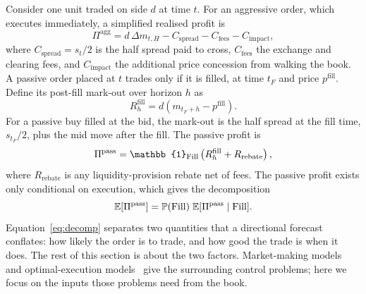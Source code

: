 Consider one unit traded on side $d$ at time $t$. For an aggressive order, which executes
immediately, a simplified realised profit is
\begin{equation}
  \Pi^{\text{agg}} = d\,\Delta m_{t,H} - C_{\text{spread}} - C_{\text{fees}} - C_{\text{impact}},
\end{equation}
where $C_{\text{spread}} = s_t/2$ is the half spread paid to cross, $C_{\text{fees}}$ the exchange
and clearing fees, and $C_{\text{impact}}$ the additional price concession from walking the book.
A passive order placed at $t$ trades only if it is filled, at time $t_F$ and price
$p^{\text{fill}}$. Define its post-fill mark-out over horizon $h$ as
\begin{equation}
  R^{\text{fill}}_{h} = d\left(m_{t_F+h} - p^{\text{fill}}\right).
  \label{eq:markout}
\end{equation}
For a passive buy filled at the bid, the mark-out is the half spread at the fill time,
$s_{t_F}/2$, plus the mid move after the fill. The passive profit is
\begin{equation}
  \Pi^{\text{pass}} = \mathbb{1}_{\Fill}\left(R^{\text{fill}}_{h} + R_{\text{rebate}}\right),
\end{equation}
where $R_{\text{rebate}}$ is any liquidity-provision rebate net of fees.
 The passive profit exists
only conditional on execution, which gives the decomposition
\begin{equation}
  \mathbb{E}[\Pi^{\text{pass}}] = \mathbb{P}(\mathrm{Fill})\; \mathbb{E}[\Pi^{\text{pass}} \mid \mathrm{Fill}].
  \label{eq:decomp}
\end{equation}
Equation~\eqref{eq:decomp} separates two quantities that a directional forecast conflates: how
likely the order is to trade, and how good the trade is when it does. The rest of this section is
about the two factors. Market-making models~\citep{avellaneda2008,cartea2015} and optimal-execution
models~\citep{almgren2001} give the surrounding control problems; here we focus on the inputs
those problems need from the book.

